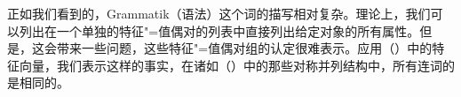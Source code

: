 
正如我们看到的，Grammatik（语法）这个词的描写相对复杂。理论上，我们可以列出在一个单独的特征"=值偶对的列表中直接列出给定对象的所有属性。但是，这会带来一些问题，这些特征"=值偶对组的认定很难表示。应用（）中的特征向量，我们表示这样的事实，在诸如（）中的那些对称并列结构中，所有连词的\catvsc 是相同的。 \label{Seite-HPSG-Koordination}

